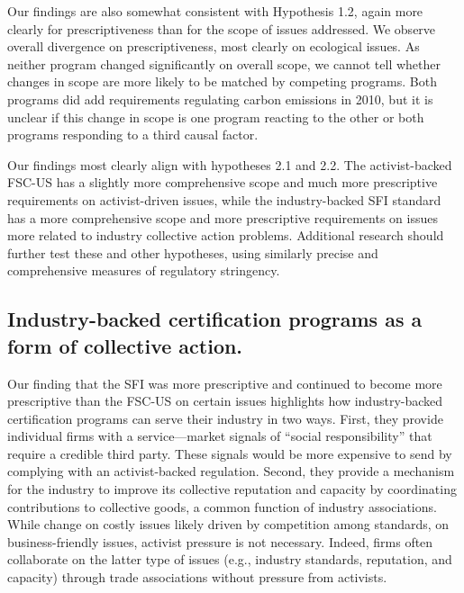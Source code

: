 \documentclass[
      12pt,
            Review ]{article}
\begin{document}
Our findings are also somewhat consistent with Hypothesis 1.2, again
more clearly for prescriptiveness than for the scope of issues
addressed. We observe overall divergence on prescriptiveness, most
clearly on ecological issues. As neither program changed significantly
on overall scope, we cannot tell whether changes in scope are more
likely to be matched by competing programs. Both programs did add
requirements regulating carbon emissions in 2010, but it is unclear if
this change in scope is one program reacting to the other or both
programs responding to a third causal factor.

Our findings most clearly align with hypotheses 2.1 and 2.2. The
activist-backed FSC-US has a slightly more comprehensive scope and much
more prescriptive requirements on activist-driven issues, while the
industry-backed SFI standard has a more comprehensive scope and more
prescriptive requirements on issues more related to industry collective
action problems. Additional research should further test these and other
hypotheses, using similarly precise and comprehensive measures of
regulatory stringency.

\subsection{Industry-backed certification programs as a form of
collective
action.}\label{industry-backed-certification-programs-as-a-form-of-collective-action.}

Our finding that the SFI was more prescriptive and continued to become
more prescriptive than the FSC-US on certain issues highlights how
industry-backed certification programs can serve their industry in two
ways. First, they provide individual firms with a service---market
signals of ``social responsibility'' that require a credible third
party. These signals would be more expensive to send by complying with
an activist-backed regulation. Second, they provide a mechanism for the
industry to improve its collective reputation and capacity by
coordinating contributions to collective goods, a common function of
industry associations. While change on costly issues likely driven by
competition among standards, on business-friendly issues, activist
pressure is not necessary. Indeed, firms often collaborate on the latter
type of issues (e.g., industry standards, reputation, and capacity)
through trade associations without pressure from activists.
\end{document}
